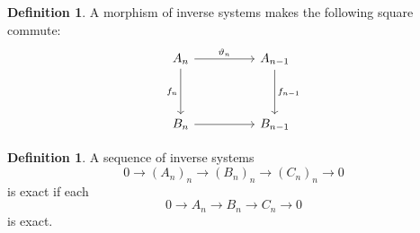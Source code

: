 \documentclass{article}
\theoremstyle{definition}
\newtheorem{definition}[theorem]{Definition}
\begin{document}
\begin{definition}
    A morphism of inverse systems makes the following square commute:
    \[
        \begin{tikzcd}[ampersand replacement=\&]
            {A_{n}} \&\& {A_{n-1}} \\
            \\
            {B_{n}} \&\& {B_{n-1}}
            \arrow["{\vartheta_{n}}", from=1-1, to=1-3]
            \arrow["{f_{n}}"', from=1-1, to=3-1]
            \arrow[from=3-1, to=3-3]
            \arrow["{f_{n-1}}", from=1-3, to=3-3]
        \end{tikzcd}
    \]
\end{definition}

\begin{definition}
    A sequence of inverse systems
    \[
        0\to (A_{n})_{n}\to (B_{n})_{n}\to (C_{n})_{n}\to 0
    \]
    is exact if each
    \[
        0\to A_{n}\to B_{n}\to C_{n}\to 0
    \]
    is exact.
\end{definition}
\end{document}

